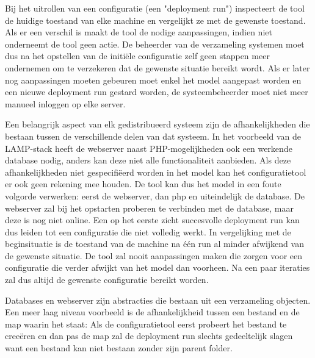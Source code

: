 Bij het uitrollen van een configuratie (een "deployment run") inspecteert de tool de huidige toestand van elke machine en vergelijkt ze met de gewenste toestand.
Als er een verschil is maakt de tool de nodige aanpassingen, indien niet onderneemt de tool geen actie.
De beheerder van de verzameling systemen moet dus na het opstellen van de initi\"ele configuratie zelf geen stappen meer ondernemen om te verzekeren dat de gewenste situatie bereikt wordt.
Als er later nog aanpassingen moeten gebeuren moet enkel het model aangepast worden en een nieuwe deployment run gestard worden, de systeembeheerder moet niet meer manueel inloggen op elke server.


Een belangrijk aspect van elk gedistribueerd systeem zijn de afhankelijkheden die bestaan tussen de verschillende delen van dat systeem.
In het voorbeeld van de LAMP-stack heeft de webserver naast PHP-mogelijkheden ook een werkende database nodig, anders kan deze niet alle functionaliteit aanbieden.
Als deze afhankelijkheden niet gespecifi\"eerd worden in het model kan het configuratietool er ook geen rekening mee houden.
De tool kan dus het model in een foute volgorde verwerken: eerst de webserver, dan php en uiteindelijk de database.
De webserver zal bij het opstarten proberen te verbinden met de database, maar deze is nog niet online.
Een op het eerste zicht succesvolle deployment run kan dus leiden tot een configuratie die niet volledig werkt.
In vergelijking met de beginsituatie is de toestand van de machine na \'e\'en run al minder afwijkend van de gewenste situatie.
De tool zal nooit aanpassingen maken die zorgen voor een configuratie die verder afwijkt van het model dan voorheen.
Na een paar iteraties zal dus altijd de gewenste configuratie bereikt worden.

Databases en webserver zijn abstracties die bestaan uit een verzameling objecten.
Een meer laag niveau voorbeeld is de afhankelijkheid tussen een bestand en de map waarin het staat:
Als de configuratietool eerst probeert het bestand te cree\"eren en dan pas de map zal de deployment run slechts gedeeltelijk slagen want een bestand kan niet bestaan zonder zijn parent folder.

